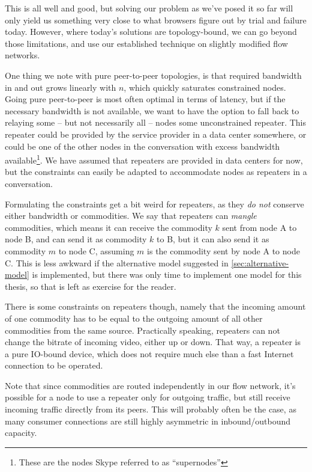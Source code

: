 This is all well and good, but solving our problem as we've posed it so far will only yield us something very close to what browsers figure out by trial and failure today. However, where today's solutions are topology-bound, we can go beyond those limitations, and use our established technique on slightly modified flow networks.

One thing we note with pure peer-to-peer topologies, is that required bandwidth in and out grows linearly with $n$, which quickly saturates constrained nodes. Going pure peer-to-peer is most often optimal in terms of latency, but if the necessary bandwidth is not available, we want to have the option to fall back to relaying some -- but not necessarily all -- nodes some unconstrained repeater. This repeater could be provided by the service provider in a data center somewhere, or could be one of the other nodes in the conversation with excess bandwidth available\footnote{These are the nodes Skype referred to as ``supernodes''}. We have assumed that repeaters are provided in data centers for now, but the constraints can easily be adapted to accommodate nodes as repeaters in a conversation.

Formulating the constraints get a bit weird for repeaters, as they \emph{do not} conserve either bandwidth or commodities. We say that repeaters can \emph{mangle} commodities, which means it can receive the commodity $k$ sent from node A to node B, and can send it as commodity $k$ to B, but it can also send it as commodity $m$ to node C, assuming $m$ is the commodity sent by node A to node C. This is less awkward if the alternative model suggested in \autoref{sec:alternative-model} is implemented, but there was only time to implement one model for this thesis, so that is left as exercise for the reader.

There is some constraints on repeaters though, namely that the incoming amount of one commodity has to be equal to the outgoing amount of all other commodities from the same source. Practically speaking, repeaters can not change the bitrate of incoming video, either up or down. That way, a repeater is a pure IO-bound device, which does not require much else than a fast Internet connection to be operated.

Note that since commodities are routed independently in our flow network, it's possible for a node to use a repeater only for outgoing traffic, but still receive incoming traffic directly from its peers. This will probably often be the case, as many consumer connections are still highly asymmetric in inbound/outbound capacity.

